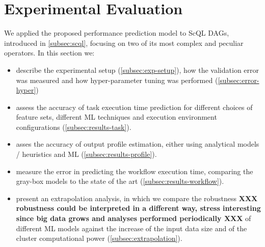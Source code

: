 \documentclass[a4paper, 10pt, conference]{ieeeconf}      %
\begin{document}
\section{Experimental Evaluation}
\label{section:evaluation}
We applied the proposed performance prediction model to ScQL DAGs, introduced in \ref{subsec:scql}, focusing on two of its most complex and peculiar operators. In this section we:
\begin{itemize}
    \item describe the experimental setup (\ref{subsec:exp-setup}), how the validation error was measured and how hyper-parameter tuning was performed (\ref{subsec:error-hyper})
    \item assess the accuracy of task execution time prediction for different choices of feature sets, different ML techniques and execution environment configurations (\ref{subsec:results-task}).
    \item asses the accuracy of output profile estimation, either using analytical models / heuristics and ML (\ref{subsec:results-profile}).
    \item measure the error in predicting the workflow execution time, comparing the gray-box models to the state of the art (\ref{subsec:results-workflow}).
    \item present an extrapolation analysis, in which we compare the robustness \textbf{XXX robustness could be interpreted in a different way, stress interesting since big data grows and analyses performed periodically XXX} of different ML models against the increase of the input data size and of the cluster computational power (\ref{subsec:extrapolation}).
\end{itemize}


\color{blue}
\color{black}


\end{document}

